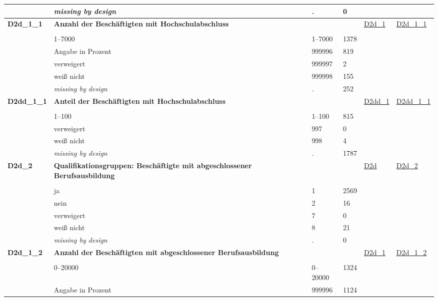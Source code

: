 \begin{longtable}{| L{2.45cm} | L{6cm} | C{1.5cm} | R{1cm} | C{2.25cm} | C{2.25cm} |}
   & \textit{missing by design} & \textit{.} & 0 &  &  \\ 
   \midrule
\textbf{D2d\_1\_1}\label{var:D2d:1:1} & \textbf{Anzahl der Beschäftigten mit Hochschulabschluss} &  &  & \hyperref[D2d:1]{D2d\_1} & \hyperref[var:suf:D2d:1:1]{D2d\_1\_1} \\ 
   &  &  &  &  &  \\ 
   & 1--7000 & 1--7000 & 1378 &  &  \\ 
   & Angabe in Prozent & 999996 & 819 &  &  \\ 
   & verweigert & 999997 & 2 &  &  \\ 
   & weiß nicht & 999998 & 155 &  &  \\ 
   & \textit{missing by design} & \textit{.} & 252 &  &  \\ 
   \midrule
\textbf{D2dd\_1\_1}\label{var:D2dd:1:1} & \textbf{Anteil der Beschäftigten mit Hochschulabschluss} &  &  & \hyperref[D2dd:1]{D2dd\_1} & \hyperref[var:suf:D2dd:1:1]{D2dd\_1\_1} \\ 
   &  &  &  &  &  \\ 
   & 1--100 & 1--100 & 815 &  &  \\ 
   & verweigert & 997 & 0 &  &  \\ 
   & weiß nicht & 998 & 4 &  &  \\ 
   & \textit{missing by design} & \textit{.} & 1787 &  &  \\ 
   \midrule
\textbf{D2d\_2}\label{var:D2d:2} & \textbf{Qualifikationsgruppen: Beschäftigte mit abgeschlossener Berufsausbildung} &  &  & \hyperref[D2d]{D2d} & \hyperref[var:suf:D2d:2]{D2d\_2} \\ 
   &  &  &  &  &  \\ 
   & ja & 1 & 2569 &  &  \\ 
   & nein & 2 & 16 &  &  \\ 
   & verweigert & 7 & 0 &  &  \\ 
   & weiß nicht & 8 & 21 &  &  \\ 
   & \textit{missing by design} & \textit{.} & 0 &  &  \\ 
   \midrule
\textbf{D2d\_1\_2}\label{var:D2d:1:2} & \textbf{Anzahl der Beschäftigten mit abgeschlossener Berufsausbildung} &  &  & \hyperref[D2d:1]{D2d\_1} & \hyperref[var:suf:D2d:1:2]{D2d\_1\_2} \\ 
   &  &  &  &  &  \\ 
   & 0--20000 & 0--20000 & 1324 &  &  \\ 
   & Angabe in Prozent & 999996 & 1124 &  &  \\ 

\end{longtable}
